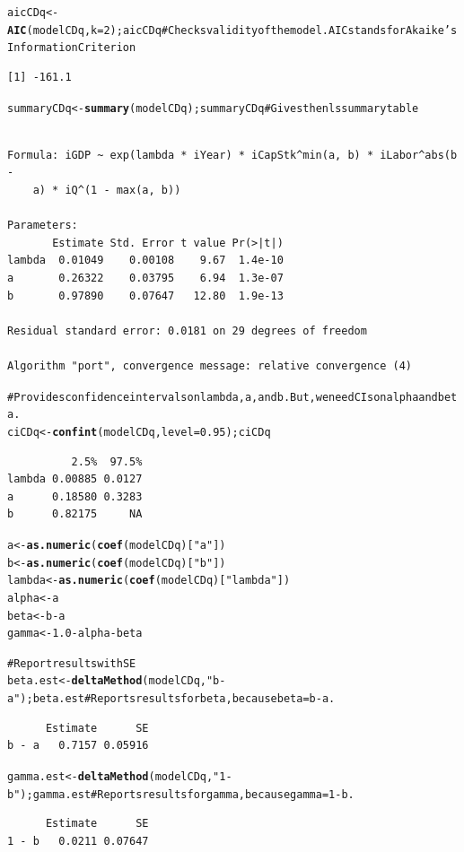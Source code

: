 \documentclass[preprint,authoryear,12pt]{elsarticle}\usepackage{graphicx, color}
\makeatletter
\newcommand{\hlfunctioncall}[1]{\textcolor[rgb]{0.501960784313725,0,0.329411764705882}{\textbf{#1}}}%
\newcommand{\hlstring}[1]{\textcolor[rgb]{0.6,0.6,1}{#1}}%
\newcommand{\hlcomment}[1]{\textcolor[rgb]{0.180392156862745,0.6,0.341176470588235}{#1}}%
\newenvironment{kframe}{%
 \def\at@end@of@kframe{}%
 \ifinner\ifhmode%
  \def\at@end@of@kframe{\end{minipage}}%
  \begin{minipage}{\columnwidth}%
 \fi\fi%
 \def\FrameCommand##1{\hskip\@totalleftmargin \hskip-\fboxsep
 \colorbox{shadecolor}{##1}\hskip-\fboxsep
     \hskip-\linewidth \hskip-\@totalleftmargin \hskip\columnwidth}%
 \MakeFramed {\advance\hsize-\width
   \@totalleftmargin\z@ \linewidth\hsize
   \@setminipage}}%
 {\par\unskip\endMakeFramed%
 \at@end@of@kframe}
\newenvironment{knitrout}{}{} %
\makeatother
\begin{document}
\begin{knitrout}
\begin{kframe}
\begin{alltt}
aicCDq <- \hlfunctioncall{AIC}(modelCDq, k=2); aicCDq \hlcomment{# Checks validity of the model. AIC stands for Akaike's Information Criterion}
\end{alltt}
\begin{verbatim}
[1] -161.1
\end{verbatim}
\begin{alltt}

summaryCDq <- \hlfunctioncall{summary}(modelCDq); summaryCDq \hlcomment{# Gives the nls summary table}
\end{alltt}
\begin{verbatim}

Formula: iGDP ~ exp(lambda * iYear) * iCapStk^min(a, b) * iLabor^abs(b - 
    a) * iQ^(1 - max(a, b))

Parameters:
       Estimate Std. Error t value Pr(>|t|)
lambda  0.01049    0.00108    9.67  1.4e-10
a       0.26322    0.03795    6.94  1.3e-07
b       0.97890    0.07647   12.80  1.9e-13

Residual standard error: 0.0181 on 29 degrees of freedom

Algorithm "port", convergence message: relative convergence (4) 
\end{verbatim}
\begin{alltt}

\hlcomment{# Provides confidence intervals on lambda, a, and b. But, we need CIs on alpha and beta.}
ciCDq <- \hlfunctioncall{confint}(modelCDq, level = 0.95); ciCDq 
\end{alltt}


{\ttfamily\noindent\itshape\color{messagecolor}{Waiting for profiling to be done...}}\begin{verbatim}
          2.5%  97.5%
lambda 0.00885 0.0127
a      0.18580 0.3283
b      0.82175     NA
\end{verbatim}
\begin{alltt}

a <- \hlfunctioncall{as.numeric}(\hlfunctioncall{coef}(modelCDq)[\hlstring{"a"}])
b <- \hlfunctioncall{as.numeric}(\hlfunctioncall{coef}(modelCDq)[\hlstring{"b"}])
lambda <- \hlfunctioncall{as.numeric}(\hlfunctioncall{coef}(modelCDq)[\hlstring{"lambda"}])
alpha <- a
beta <- b - a
gamma <- 1.0 - alpha - beta

\hlcomment{# Report results with SE}
beta.est <- \hlfunctioncall{deltaMethod}(modelCDq, \hlstring{"b-a"}); beta.est # Reports results for beta, because beta = b - a.
\end{alltt}
\begin{verbatim}
      Estimate      SE
b - a   0.7157 0.05916
\end{verbatim}
\begin{alltt}
gamma.est <- \hlfunctioncall{deltaMethod}(modelCDq, \hlstring{"1-b"}); gamma.est # Reports results for gamma, because gamma = 1 - b.
\end{alltt}
\begin{verbatim}
      Estimate      SE
1 - b   0.0211 0.07647
\end{verbatim}
\begin{alltt}


\end{alltt}
\end{kframe}
\end{knitrout}
\end{document}
